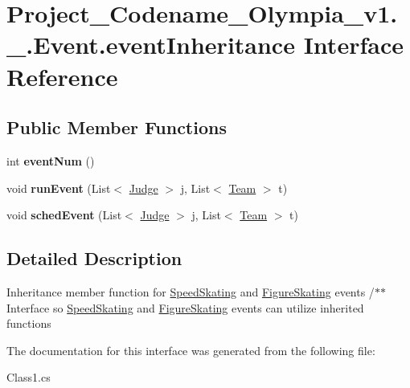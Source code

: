 \hypertarget{interfaceProject__Codename__Olympia__v1_1_1__0_1_1Event_1_1eventInheritance}{}\section{Project\+\_\+\+Codename\+\_\+\+Olympia\+\_\+v1.\+\_.\+Event.\+event\+Inheritance Interface Reference}
\label{interfaceProject__Codename__Olympia__v1_1_1__0_1_1Event_1_1eventInheritance}
\subsection*{Public Member Functions}
\begin{DoxyCompactItemize}
\item 
\mbox{\label{interfaceProject__Codename__Olympia__v1_1_1__0_1_1Event_1_1eventInheritance_adda2d1d9122f9327f73a0af670551e59}} 
int {\bfseries event\+Num} ()
\item 
\mbox{\label{interfaceProject__Codename__Olympia__v1_1_1__0_1_1Event_1_1eventInheritance_a89c0953ab749607d5d4e34338e1daac3}} 
void {\bfseries run\+Event} (List$<$ \hyperlink{classProject__Codename__Olympia__v1_1_1__0_1_1Judge}{Judge} $>$ j, List$<$ \hyperlink{classProject__Codename__Olympia__v1_1_1__0_1_1Team}{Team} $>$ t)
\item 
\mbox{\label{interfaceProject__Codename__Olympia__v1_1_1__0_1_1Event_1_1eventInheritance_a440deb71af87d95041fb3a64e869de39}} 
void {\bfseries sched\+Event} (List$<$ \hyperlink{classProject__Codename__Olympia__v1_1_1__0_1_1Judge}{Judge} $>$ j, List$<$ \hyperlink{classProject__Codename__Olympia__v1_1_1__0_1_1Team}{Team} $>$ t)
\end{DoxyCompactItemize}


\subsection{Detailed Description}
Inheritance member function for \hyperlink{classProject__Codename__Olympia__v1_1_1__0_1_1SpeedSkating}{Speed\+Skating} and \hyperlink{classProject__Codename__Olympia__v1_1_1__0_1_1FigureSkating}{Figure\+Skating} events /$\ast$$\ast$ Interface so \hyperlink{classProject__Codename__Olympia__v1_1_1__0_1_1SpeedSkating}{Speed\+Skating} and \hyperlink{classProject__Codename__Olympia__v1_1_1__0_1_1FigureSkating}{Figure\+Skating} events can utilize inherited functions 

The documentation for this interface was generated from the following file\+:\begin{DoxyCompactItemize}
\item 
Class1.\+cs\end{DoxyCompactItemize}
